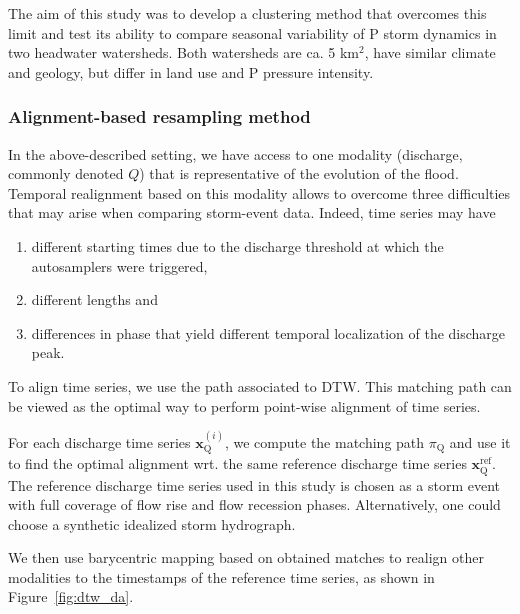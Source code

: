 The aim of this study was to develop a clustering method that overcomes this
limit and test its ability to compare seasonal variability of P storm dynamics
in two headwater watersheds. Both watersheds are ca. 5 km$^2$, have similar
climate and geology, but differ in land use and P pressure intensity.

\subsubsection{Alignment-based resampling method}

In the above-described setting, we have access to one modality (discharge,
commonly denoted $Q$) that is representative of the evolution of the flood.
Temporal realignment based on this modality allows to overcome three
difficulties that may arise when comparing storm-event data.
Indeed, time series may have

\begin{enumerate}
\item different starting times due to the discharge threshold at which the
autosamplers were triggered,
\item different lengths  and
\item differences in phase that yield different temporal localization of the
discharge peak.
\end{enumerate}

To align time series, we use the path associated to DTW.
This matching path can be viewed as the optimal way to perform point-wise
alignment of time series.

For each discharge time series $\mathbf{x}^{(i)}_\text{Q}$, we compute the
matching path $\pi_\text{Q}$ and use it to find the optimal alignment wrt.
the same reference discharge time series $\mathbf{x}^\text{ref}_\text{Q}$.
The reference discharge time series used in this study is chosen
as a storm event with full coverage of flow rise and flow recession phases.
Alternatively, one could choose a synthetic idealized storm hydrograph.

We then use barycentric mapping based on obtained matches to realign other
modalities to the timestamps of the reference time series, as shown in
Figure~\ref{fig:dtw_da}.

